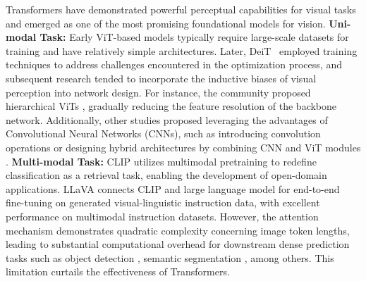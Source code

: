 Transformers \citep{DBLP:conf/iclr/DosovitskiyB0WZ21,DBLP:conf/cvpr/DongBCZYYCG22,DBLP:conf/iccv/LiuL00W0LG21,cao2021pursuit,cao2023iterative} 
have demonstrated powerful perceptual capabilities for visual tasks and emerged as one of the most promising foundational models for vision. 
\noindent\textbf{Uni-modal Task:} 
Early ViT-based models typically require large-scale datasets \citep{DBLP:conf/iclr/DosovitskiyB0WZ21} for training and have relatively simple architectures. Later, DeiT~\citep{DBLP:conf/icml/TouvronCDMSJ21} employed training techniques to address challenges encountered in the optimization process, and subsequent research tended to incorporate the inductive biases of visual perception into network design. For instance, the community proposed hierarchical ViTs \citep{DBLP:conf/iccv/LiuL00W0LG21,DBLP:conf/cvpr/DongBCZYYCG22,DBLP:conf/nips/DaiLLT21}, gradually reducing the feature resolution of the backbone network. Additionally, other studies proposed leveraging the advantages of Convolutional Neural Networks (CNNs), such as introducing convolution operations \citep{DBLP:conf/nips/DaiLLT21,DBLP:conf/cvpr/VaswaniRSPHS21,chen2023dynamic} or designing hybrid architectures by combining CNN and ViT modules \citep{DBLP:conf/nips/DaiLLT21}. 
\textbf{Multi-modal Task:} CLIP \citep{DBLP:conf/icml/RadfordKHRGASAM21} utilizes multimodal pretraining to redefine classification as a retrieval task, enabling the development of open-domain applications.  
LLaVA \citep{liu2024visual} connects CLIP and large language model for end-to-end fine-tuning on generated visual-linguistic instruction data, with excellent performance on multimodal instruction datasets.%
 However, the attention mechanism \citep{DBLP:conf/nips/BrownMRSKDNSSAA20} demonstrates quadratic complexity concerning image token lengths, leading to substantial computational overhead for downstream dense prediction tasks such as object detection \citep{DBLP:journals/pieee/ZouCSGY23}, semantic segmentation \citep{DBLP:journals/eaai/ThisankeDCSVH23}, among others. This limitation curtails the effectiveness of Transformers.
